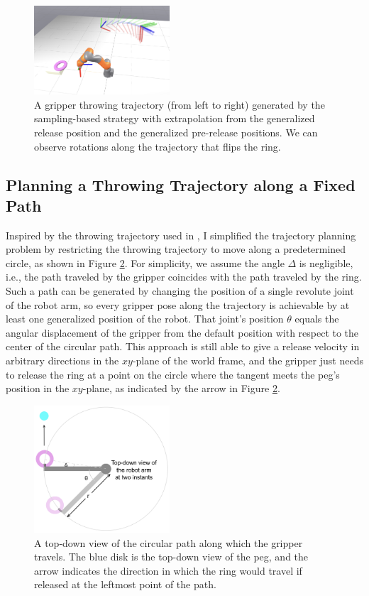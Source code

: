 \documentclass[conference]{IEEEtran}
\begin{document}
\begin{figure}[ht]
\centering
\includegraphics[width=0.45\textwidth]{images/sample_rotation_traj.png}
\caption{A gripper throwing trajectory (from left to right) generated by the sampling-based strategy with extrapolation from the generalized release position and the generalized pre-release positions. We can observe rotations along the trajectory that flips the ring.}
\label{fig:sample_rotation_traj}
\end{figure}

\subsection{Planning a Throwing Trajectory along a Fixed Path}
Inspired by the throwing trajectory used in \cite{ramirez2023robotic}, I simplified the trajectory planning problem by restricting the throwing trajectory to move along a predetermined circle, as shown in Figure \ref{fig:circle}. For simplicity, we assume the angle $\Delta$ is negligible, i.e., the path traveled by the gripper coincides with the path traveled by the ring. Such a path can be generated by changing the position of a single revolute joint of the robot arm, so every gripper pose along the trajectory is achievable by at least one generalized position of the robot. That joint's position $\theta$ equals the angular displacement of the gripper from the default position with respect to the center of the circular path. This approach is still able to give a release velocity in arbitrary directions in the $xy$-plane of the world frame, and the gripper just needs to release the ring at a point on the circle where the tangent meets the peg's position in the $xy$-plane, as indicated by the arrow in Figure \ref{fig:circle}.

\begin{figure}[ht]
\centering
\includegraphics[width=0.45\textwidth]{images/circle.png}
\caption{A top-down view of the circular path along which the gripper travels. The blue disk is the top-down view of the peg, and the arrow indicates the direction in which the ring would travel if released at the leftmost point of the path.}
\label{fig:circle}
\end{figure}
\end{document}
